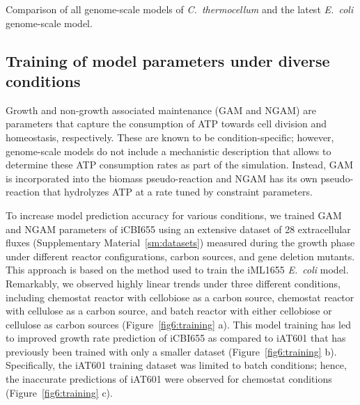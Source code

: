\begin{table}[h]
    \caption[Comparison of all genome-scale models of \textit{C.~thermocellum}]{Comparison of all genome-scale models of \textit{C.~thermocellum} and the latest \textit{E.~coli} genome-scale model.}
    \centering
    
    \label{tab6:models}
\end{table}


\subsection{Training of model parameters under diverse conditions}

Growth and non-growth associated maintenance (GAM and NGAM) are parameters that capture the consumption of ATP towards cell division and homeostasis, respectively. These are known to be condition-specific; however, genome-scale models do not include a mechanistic description that allows to determine these ATP consumption rates as part of the simulation. Instead, GAM is incorporated into the biomass pseudo-reaction and NGAM has its own pseudo-reaction that hydrolyzes ATP at a rate tuned by constraint parameters.

To increase model prediction accuracy for various conditions, we trained GAM and NGAM parameters of iCBI655 using an extensive dataset of 28 extracellular fluxes (Supplementary Material~\ref{sm:datasets}) measured during the
growth phase under different reactor configurations, carbon sources, and gene deletion mutants. This approach is based on the method used to train the iML1655 \textit{E.~coli} model. \citep{monk2017}
Remarkably, we observed highly linear trends under three different conditions, including chemostat reactor with cellobiose as a carbon source, chemostat reactor with cellulose as a carbon source, and batch reactor with either cellobiose or cellulose as carbon sources (Figure~\ref{fig6:training} a). This model training has led to improved growth rate prediction of iCBI655 as compared to iAT601 that has previously been trained with only a smaller dataset (Figure~\ref{fig6:training} b). Specifically, the iAT601 training dataset was limited to batch conditions; hence, the inaccurate predictions of iAT601 were observed for chemostat conditions (Figure~\ref{fig6:training} c).

